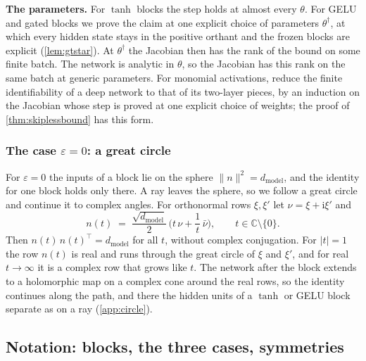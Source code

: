 \documentclass[10pt]{article}
\theoremstyle{definition}
\theoremstyle{remark}
\newcommand{\dm}{d_{\mathrm{model}}}
\newcommand{\norm}[1]{\lVert #1\rVert}
\newcommand{\para}[1]{\smallskip\noindent\textbf{#1}\hspace{0.5em}}
\begin{document}
\para{The parameters.} For $\tanh$ blocks the step holds at almost every $\theta$. For GELU and gated blocks we prove the claim at one explicit choice of parameters $\theta^\dagger$, at which every hidden state stays in the positive orthant and the frozen blocks are explicit (\cref{lem:gtstar}). At $\theta^\dagger$ the Jacobian then has the rank of the bound on some finite batch. The network is analytic in $\theta$, so the Jacobian has this rank on the same batch at generic parameters. For monomial activations, \citet[Theorem~11]{usevich2025identifiability} reduce the finite identifiability of a deep network to that of its two-layer pieces, by an induction on the Jacobian whose step is proved at one explicit choice of weights; the proof of \cref{thm:skiplessbound} has this form.

\subsubsection*{The case $\varepsilon = 0$: a great circle}

For $\varepsilon = 0$ the inputs of a block lie on the sphere $\norm{n}^2 = \dm$, and the identity for one block holds only there. A ray leaves the sphere, so we follow a great circle and continue it to complex angles. For orthonormal rows $\xi, \xi'$ let $\nu = \xi + \mathrm i\xi'$ and
\[
n(t) \;=\; \frac{\sqrt{\dm}}{2}\,\Big(t\,\nu + \frac{1}{t}\,\bar\nu\Big), \qquad t \in \mathbb C\setminus\{0\}.
\]
Then $n(t)\,n(t)^\top = \dm$ for all $t$, without complex conjugation. For $\lvert t\rvert = 1$ the row $n(t)$ is real and runs through the great circle of $\xi$ and $\xi'$, and for real $t \to \infty$ it is a complex row that grows like $t$. The network after the block extends to a holomorphic map on a complex cone around the real rows, so the identity continues along the path, and there the hidden units of a $\tanh$ or GELU block separate as on a ray (\cref{app:circle}).

\subsection{Notation: blocks, the three cases, symmetries}\label{app:notation}
\end{document}

